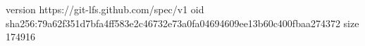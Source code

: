 version https://git-lfs.github.com/spec/v1
oid sha256:79a62f351d7bfa4ff583e2c46732e73a0fa04694609ee13b60c400fbaa274372
size 174916
